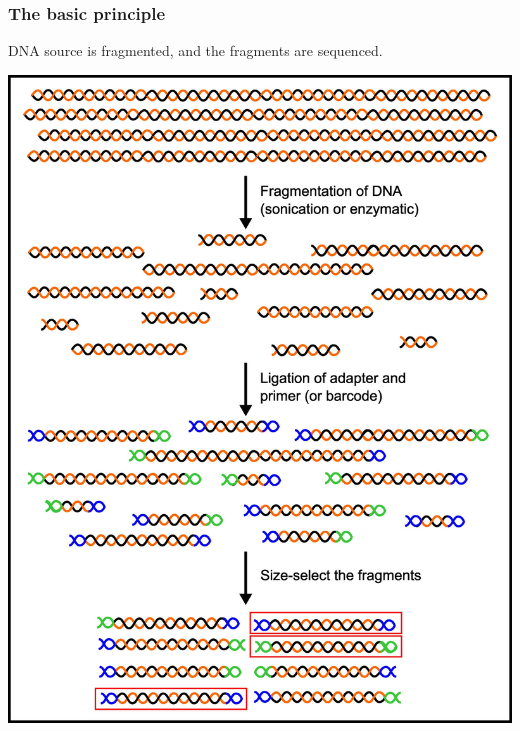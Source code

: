 \begin{frame}
  \frametitle{The basic principle}
  DNA source is fragmented, and the fragments are sequenced. \\
  \begin{center}
    \includegraphics[height=0.7\textheight]{images/library_preparation}
  \end{center}      
\end{frame}

